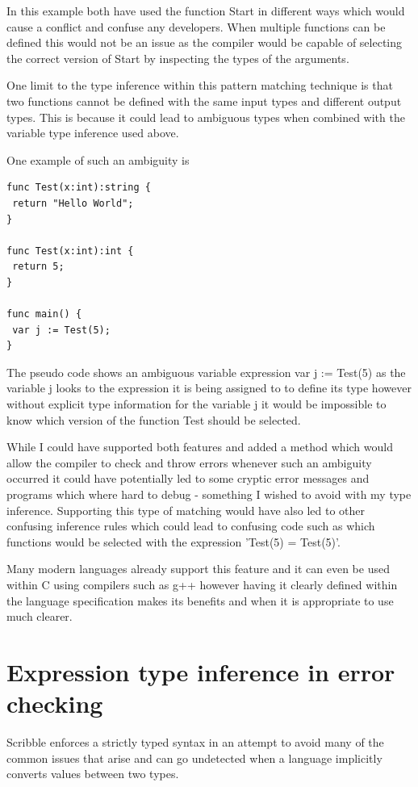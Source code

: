 \documentclass[]{final_report}
\begin{document}
In this example both have used the function Start in different ways which would cause a conflict and confuse any developers. When multiple functions can be defined this would not be an issue as the compiler would be capable of selecting the correct version of Start by inspecting the types of the arguments.

One limit to the type inference within this pattern matching technique is that two functions cannot be defined with the same input types and different output types. This is because it could lead to ambiguous types when combined with the variable type inference used above.

One example of such an ambiguity is
\begin{verbatim}
func Test(x:int):string {
 return "Hello World";
}

func Test(x:int):int {
 return 5; 
}

func main() { 
 var j := Test(5);
}
\end{verbatim}

The pseudo code shows an ambiguous variable expression var j := Test(5) as the variable j looks to the expression it is being assigned to to define its type however without explicit type information for the variable j it would be impossible to know which version of the function Test should be selected.

While I could have supported both features and added a method which would allow the compiler to check and throw errors whenever such an ambiguity occurred it could have potentially led to some cryptic error messages and programs which where hard to debug - something I wished to avoid with my type inference. Supporting this type of matching would have also led to other confusing inference rules which could lead to confusing code such as which functions would be selected with the expression 'Test(5) = Test(5)'.

Many modern languages already support this feature and it can even be used within C using compilers such as g++ however having it clearly defined within the language specification makes its benefits and when it is appropriate to use much clearer.

\section{Expression type inference in error checking}

Scribble enforces a strictly typed syntax in an attempt to avoid many of the common issues that arise and can go undetected when a language implicitly converts values between two types.
\end{document}

